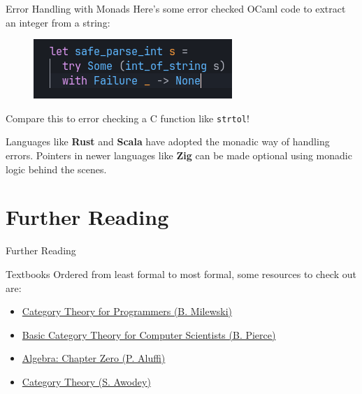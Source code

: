 \documentclass{purdue-slide}
\begin{document}
\begin{frame}{Error Handling with Monads}
    Here's some error checked OCaml code to extract an integer from a string:
    \begin{figure}
        \centering
        \includegraphics[width=0.5\linewidth]{image.png}
    \end{figure}

    \par \medskip Compare this to error checking a C function like \texttt{strtol}! \par \medskip Languages like \textbf{Rust} and \textbf{Scala} have adopted the monadic way of handling errors. Pointers in newer languages like \textbf{Zig} can be made optional using monadic logic behind the scenes.
\end{frame}

\section{Further Reading}

\begin{titleframe}{Further Reading}
\end{titleframe}

\begin{frame}{Textbooks}
    Ordered from least formal to most formal, some resources to check out are: \begin{itemize}
    \item \href{https://bartoszmilewski.com/2014/10/28/category-theory-for-programmers-the-preface/}{Category Theory for Programmers (B. Milewski)}
    \item \href{https://books.google.co.in/books/about/Basic_Category_Theory_for_Computer_Scien.html?id=ezdeaHfpYPwC&redir_esc=y}{Basic Category Theory for Computer Scientists (B. Pierce)}
    \item \href{https://www.google.com/books/edition/Algebra_Chapter_0/deWkZWYbyHQC?hl=en&gbpv=1&dq=algebra:+chapter+zero&printsec=frontcover}{Algebra: Chapter Zero (P. Aluffi)}
    \item \href{https://github.com/geelon/type-theory/blob/master/awodey-category-theory.pdf}{Category Theory (S. Awodey)}
\end{itemize}

\end{frame}
\end{document}
